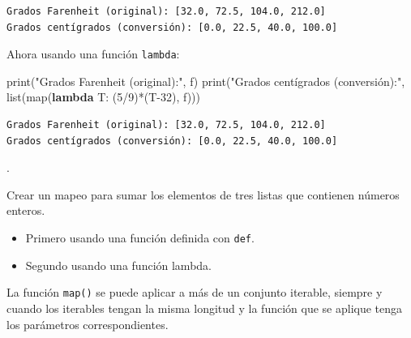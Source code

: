 \documentclass[
  spanish,
  letterpaper,
]{scrbook}
\newenvironment{Shaded}{\begin{snugshade}}{\end{snugshade}}
\newcommand{\BuiltInTok}[1]{\textcolor[rgb]{0.00,0.23,0.31}{#1}}
\newcommand{\DecValTok}[1]{\textcolor[rgb]{0.68,0.00,0.00}{#1}}
\newcommand{\KeywordTok}[1]{\textcolor[rgb]{0.00,0.23,0.31}{\textbf{#1}}}
\newcommand{\NormalTok}[1]{\textcolor[rgb]{0.00,0.23,0.31}{#1}}
\newcommand{\OperatorTok}[1]{\textcolor[rgb]{0.37,0.37,0.37}{#1}}
\newcommand{\StringTok}[1]{\textcolor[rgb]{0.13,0.47,0.30}{#1}}
\providecommand{\tightlist}{%
  \setlength{\itemsep}{0pt}\setlength{\parskip}{0pt}}
\theoremstyle{definition}
\theoremstyle{remark}
\newcounter{quartocalloutexmno}
\newcommand{\quartocalloutexm}[1]{\refstepcounter{quartocalloutexmno}\label{#1}}
\begin{document}
\begin{verbatim}
Grados Farenheit (original): [32.0, 72.5, 104.0, 212.0]
Grados centígrados (conversión): [0.0, 22.5, 40.0, 100.0]
\end{verbatim}

Ahora usando una función \texttt{lambda}:

\begin{Shaded}
\begin{Highlighting}[]
\BuiltInTok{print}\NormalTok{(}\StringTok{"Grados Farenheit (original):"}\NormalTok{, f)}
\BuiltInTok{print}\NormalTok{(}\StringTok{"Grados centígrados (conversión):"}\NormalTok{, }\BuiltInTok{list}\NormalTok{(}\BuiltInTok{map}\NormalTok{(}\KeywordTok{lambda}\NormalTok{ T: (}\DecValTok{5}\OperatorTok{/}\DecValTok{9}\NormalTok{)}\OperatorTok{*}\NormalTok{(T}\OperatorTok{{-}}\DecValTok{32}\NormalTok{), f)))}
\end{Highlighting}
\end{Shaded}

\begin{verbatim}
Grados Farenheit (original): [32.0, 72.5, 104.0, 212.0]
Grados centígrados (conversión): [0.0, 22.5, 40.0, 100.0]
\end{verbatim}

.

\begin{tcolorbox}[enhanced jigsaw, colframe=quarto-callout-tip-color-frame, opacityback=0, toprule=.15mm, colback=white, coltitle=black, leftrule=.75mm, arc=.35mm, breakable, left=2mm, bottomtitle=1mm, rightrule=.15mm, bottomrule=.15mm, colbacktitle=quarto-callout-tip-color!10!white, toptitle=1mm, titlerule=0mm, opacitybacktitle=0.6, title={Tip \ref*{exm-s-4}}]

\quartocalloutexm{exm-s-4} 

Crear un mapeo para sumar los elementos de tres listas que contienen
números enteros.

\begin{itemize}
\tightlist
\item
  Primero usando una función definida con \texttt{def}.
\item
  Segundo usando una función lambda.
\end{itemize}

\end{tcolorbox}

\begin{tcolorbox}[enhanced jigsaw, colframe=quarto-callout-note-color-frame, opacityback=0, toprule=.15mm, colback=white, coltitle=black, leftrule=.75mm, arc=.35mm, breakable, left=2mm, bottomtitle=1mm, rightrule=.15mm, bottomrule=.15mm, colbacktitle=quarto-callout-note-color!10!white, toptitle=1mm, titlerule=0mm, opacitybacktitle=0.6, title=\textcolor{quarto-callout-note-color}{\faInfo}\hspace{0.5em}{Nota.}]

La función \texttt{map()} se puede aplicar a más de un conjunto
iterable, siempre y cuando los iterables tengan la misma longitud y la
función que se aplique tenga los parámetros correspondientes.

\end{tcolorbox}
\end{document}
